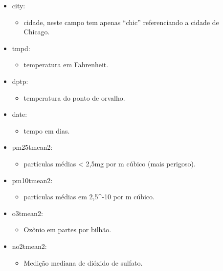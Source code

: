 \documentclass[]{book}
\providecommand{\tightlist}{%
  \setlength{\itemsep}{0pt}\setlength{\parskip}{0pt}}
\begin{document}
\begin{itemize}
\tightlist
\item
  city:

  \begin{itemize}
  \tightlist
  \item
    cidade, neste campo tem apenas ``chic'' referenciando a cidade de Chicago.
  \end{itemize}
\item
  tmpd:

  \begin{itemize}
  \tightlist
  \item
    temperatura em Fahrenheit.
  \end{itemize}
\item
  dptp:

  \begin{itemize}
  \tightlist
  \item
    temperatura do ponto de orvalho.
  \end{itemize}
\item
  date:

  \begin{itemize}
  \tightlist
  \item
    tempo em dias.
  \end{itemize}
\item
  pm25tmean2:

  \begin{itemize}
  \tightlist
  \item
    partículas médias \textless{} 2,5mg por m cúbico (mais perigoso).
  \end{itemize}
\item
  pm10tmean2:

  \begin{itemize}
  \tightlist
  \item
    partículas médias em 2,5\^{}-10 por m cúbico.
  \end{itemize}
\item
  o3tmean2:

  \begin{itemize}
  \tightlist
  \item
    Ozônio em partes por bilhão.
  \end{itemize}
\item
  no2tmean2:

  \begin{itemize}
  \tightlist
  \item
    Medição mediana de dióxido de sulfato.
  \end{itemize}
\end{itemize}
\end{document}
